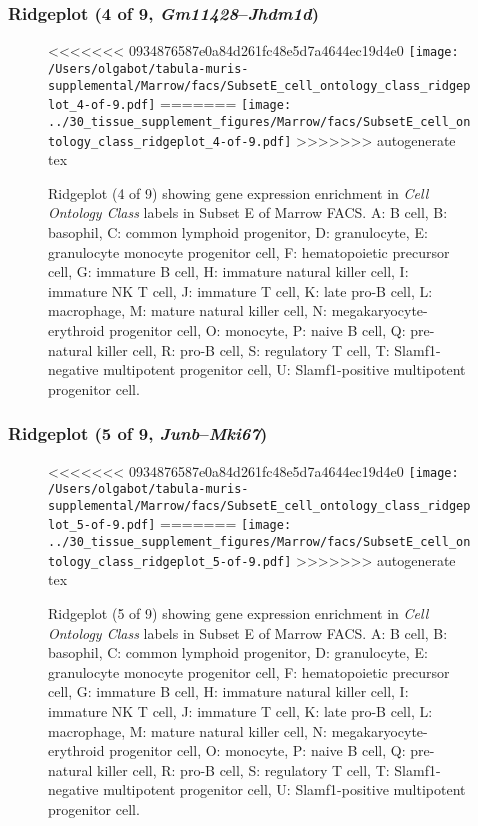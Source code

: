 \clearpage

\subsubsection{Ridgeplot (4 of 9, \emph{Gm11428}--\emph{Jhdm1d})}
\begin{figure}[h]
\centering
<<<<<<< 0934876587e0a84d261fc48e5d7a4644ec19d4e0
\texttt{[image: /Users/olgabot/tabula-muris-supplemental/Marrow/facs/SubsetE\_cell\_ontology\_class\_ridgeplot\_4-of-9.pdf]}
=======
\texttt{[image: ../30\_tissue\_supplement\_figures/Marrow/facs/SubsetE\_cell\_ontology\_class\_ridgeplot\_4-of-9.pdf]}
>>>>>>> autogenerate tex

\caption{ Ridgeplot (4 of 9)  showing gene expression enrichment in \emph{Cell Ontology Class} labels in Subset E of Marrow FACS. A: B cell, B: basophil, C: common lymphoid progenitor, D: granulocyte, E: granulocyte monocyte progenitor cell, F: hematopoietic precursor cell, G: immature B cell, H: immature natural killer cell, I: immature NK T cell, J: immature T cell, K: late pro-B cell, L: macrophage, M: mature natural killer cell, N: megakaryocyte-erythroid progenitor cell, O: monocyte, P: naive B cell, Q: pre-natural killer cell, R: pro-B cell, S: regulatory T cell, T: Slamf1-negative multipotent progenitor cell, U: Slamf1-positive multipotent progenitor cell.}
\end{figure}


\clearpage

\subsubsection{Ridgeplot (5 of 9, \emph{Junb}--\emph{Mki67})}
\begin{figure}[h]
\centering
<<<<<<< 0934876587e0a84d261fc48e5d7a4644ec19d4e0
\texttt{[image: /Users/olgabot/tabula-muris-supplemental/Marrow/facs/SubsetE\_cell\_ontology\_class\_ridgeplot\_5-of-9.pdf]}
=======
\texttt{[image: ../30\_tissue\_supplement\_figures/Marrow/facs/SubsetE\_cell\_ontology\_class\_ridgeplot\_5-of-9.pdf]}
>>>>>>> autogenerate tex

\caption{ Ridgeplot (5 of 9)  showing gene expression enrichment in \emph{Cell Ontology Class} labels in Subset E of Marrow FACS. A: B cell, B: basophil, C: common lymphoid progenitor, D: granulocyte, E: granulocyte monocyte progenitor cell, F: hematopoietic precursor cell, G: immature B cell, H: immature natural killer cell, I: immature NK T cell, J: immature T cell, K: late pro-B cell, L: macrophage, M: mature natural killer cell, N: megakaryocyte-erythroid progenitor cell, O: monocyte, P: naive B cell, Q: pre-natural killer cell, R: pro-B cell, S: regulatory T cell, T: Slamf1-negative multipotent progenitor cell, U: Slamf1-positive multipotent progenitor cell.}
\end{figure}


